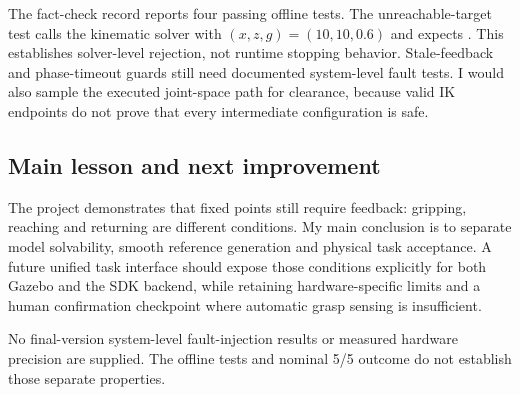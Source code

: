 The fact-check record reports four passing offline tests. The unreachable-target test calls the kinematic solver with $(x,z,g)=(10,10,0.6)$ and expects . This establishes solver-level rejection, not runtime stopping behavior. Stale-feedback and phase-timeout guards still need documented system-level fault tests. I would also sample the executed joint-space path for clearance, because valid IK endpoints do not prove that every intermediate configuration is safe.
\subsection{Main lesson and next improvement}
The project demonstrates that fixed points still require feedback: gripping, reaching and returning are different conditions. My main conclusion is to separate model solvability, smooth reference generation and physical task acceptance. A future unified task interface should expose those conditions explicitly for both Gazebo and the SDK backend, while retaining hardware-specific limits and a human confirmation checkpoint where automatic grasp sensing is insufficient.

No final-version system-level fault-injection results or measured hardware precision are supplied. The offline tests and nominal 5/5 outcome do not establish those separate properties.
\githubsection
{}

